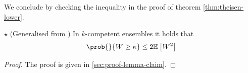 \documentclass[../main.tex]{subfiles}
\begin{document}
We conclude by checking the inequality in the proof of theorem \ref{thm:theisen-lower}.
\begin{lemma} $\star$ (Generalised from \cite{theisen_WhenAreEnsembles_2023}) In $k$-competent ensembles it holds that
\label{thm:lemma-claim}
$$
\prob{}{W \geq \kappa} \leq 2 \mathbb{E}_{}\left[ W^2 \right] 
$$
\end{lemma}
\begin{proof}
    The proof is given in \ref{sec:proof-lemma-claim}.
\end{proof}







\end{document}
